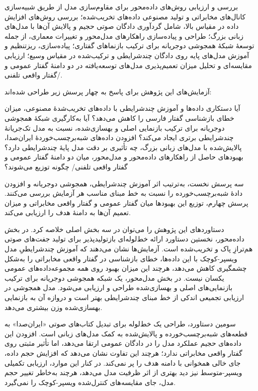  بررسی و ارزیابی روش‌های داده‌محور برای مقاوم‌سازی مدل از طریق شبیه‌سازی کانال‌های مخابراتی و تولید مصنوعی داده‌های تخریب‌شده؛
 بررسی روش‌های افزایش داده در مقیاس بالا، شامل گردآوری دادگان صوتی حجیم و پالایش آن‌ها با مدل‌های زبانی بزرگ؛
 طراحی و پیاده‌سازی راهکارهای مدل‌محور و تغییرات معماری، از جمله توسعهٔ شبکهٔ همجوشی دوجریانه برای ترکیب بازنما‌های گفتاری؛
 پیاده‌سازی، ریزتنظیم و آموزش مدل‌های پایه روی دادگان چندشرایطی و ترکیب‌شده در مقیاس وسیع؛
 ارزیابی مقایسه‌ای و تحلیل میزان تعمیم‌پذیری مدل‌های توسعه‌یافته در دو دامنهٔ گفتار عمومی و گفتار واقعی تلفنی/.

آزمایش‌های این پژوهش برای پاسخ به چهار پرسش زیر طراحی شده‌اند:

 آیا دستکاری داده‌ها و آموزش چندشرایطی با داده‌های تخریب‌شدهٔ مصنوعی، میزان خطای بازشناسی گفتار فارسی را کاهش می‌دهد؟
 آیا به‌کارگیری شبکهٔ همجوشی دوجریانه برای ترکیب بازنمایی اصلی و بهسازی‌شده، نسبت به مدل تک‌جریانهٔ چندشرایطی برتری ایجاد می‌کند؟
 افزودن داده‌های شبه‌برچسب‌خوردهٔ ایران‌صدا، پالایش‌شده با مدل‌های زبانی بزرگ، چه تأثیری بر دقت مدل پایهٔ چندشرایطی دارد؟
 بهبودهای حاصل از راهکارهای داده‌محور و مدل‌محور، میان دو دامنهٔ گفتار عمومی و گفتار واقعی تلفنی/ چگونه توزیع می‌شوند؟

سه پرسش نخست، به‌ترتیب اثر آموزش چندشرایطی، همجوشی دوجریانه و افزودن دادهٔ شبه‌برچسب‌خورده را نسبت به خط مبنای مناسب هر آزمایش بررسی می‌کنند. پرسش چهارم، توزیع این بهبودها میان گفتار عمومی و گفتار واقعی مخابراتی و میزان تعمیم آن‌ها به دامنهٔ هدف را ارزیابی می‌کند.


دستاوردهای این پژوهش را می‌توان در سه بخش اصلی خلاصه کرد. در بخش داده‌محور، نخستین دستاورد ارائه خط‌لوله‌ای بازتولیدپذیر برای تولید جفت‌های صوتی هم‌ترازِ پاک و تخریب‌شده است. آزمایش‌ها نشان می‌دهند که آموزش چندشرایطیِ مدل ویسپر-کوچک با این داده‌ها، خطای بازشناسی در گفتار واقعی مخابراتی را به‌شکل چشمگیری کاهش می‌دهد، هرچند این میزان بهبود روی همه مجموعه‌داده‌های عمومی یکسان نیست. در بخش مدل‌محور، یک شبکه همجوشی دوجریانه برای ترکیب بازنمایی‌های اصلی و بهسازی‌شده طراحی و ارزیابی می‌شود. مدل همجوشی در ارزیابی تجمیعی اندکی از خط مبنای چندشرایطی بهتر است و دروازه آن به بازنمایی بهسازی‌شده وزن بیشتری می‌دهد.

سومین دستاورد، طراحی یک خط‌لوله برای تبدیل کتاب‌های صوتی «ایران‌صدا» به قطعه‌های شبه‌برچسب‌خورده و پالایش‌شده به کمک مدل‌های زبانی است. افزودن این داده‌های حجیم عملکرد مدل را در دادگان عمومی ارتقا می‌دهد، اما تأثیر مثبتی روی گفتار واقعی مخابراتی ندارد؛ هرچند این تفاوت نشان ‌می‌دهد که افزایش حجم داده، جای خالی همخوانی با دامنه هدف را پر نمی‌کند. در کنار این موارد، ارزیابی تکمیلی ویسپر-متوسط نیز دید بهتری از اثر ظرفیت مدل ‌می‌دهد، هرچند به‌خاطر تغییر حجم مدل، جای مقایسه‌های کنترل‌شده ویسپر-کوچک را نمی‌گیرد.

